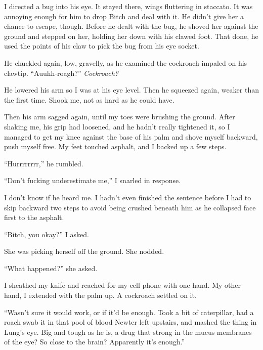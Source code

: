 I directed a bug into his eye.  It stayed there, wings fluttering in staccato.  It was annoying enough for him to drop Bitch and deal with it.  He didn't give her a chance to escape, though.  Before he dealt with the bug, he shoved her against the ground and stepped on her, holding her down with his clawed foot.  That done, he used the points of his claw to pick the bug from his eye socket.



He chuckled again, low, gravelly, as he examined the cockroach impaled on his clawtip.  ``Auuhh-roagh?''  \emph{Cockroach?}



He lowered his arm so I was at his eye level.  Then he squeezed again, weaker than the first time.  Shook me, not as hard as he could have.



Then his arm sagged again, until my toes were brushing the ground.  After shaking me, his grip had loosened, and he hadn't really tightened it, so I managed to get my knee against the base of his palm and shove myself backward, push myself free.  My feet touched asphalt, and I backed up a few steps.



``Hurrrrrrrr,'' he rumbled.



``Don't fucking underestimate me,'' I snarled in response.



I don't know if he heard me.  I hadn't even finished the sentence before I had to skip backward two steps to avoid being crushed beneath him as he collapsed face first to the asphalt.



``Bitch, you okay?'' I asked.



She was picking herself off the ground.  She nodded.



``What happened?'' she asked.



I sheathed my knife and reached for my cell phone with one hand.  My other hand, I extended with the palm up.  A cockroach settled on it.



``Wasn't sure it would work, or if it'd be enough.  Took a bit of caterpillar, had a roach swab it in that pool of blood Newter left upstairs, and mashed the thing in Lung's eye.  Big and tough as he is, a drug that strong in the mucus membranes of the eye?  So close to the brain?  Apparently it's enough.''



